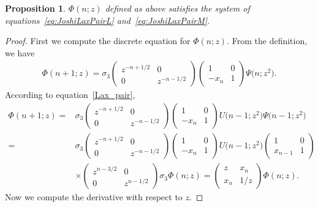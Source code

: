 \documentclass[pdftex]{sigma}%
\numberwithin{equation}{section}
\newtheorem{Proposition}[Theorem]{Proposition}
 { \theoremstyle{definition}
\newtheorem{Definition}[Theorem]{Definition}
\newtheorem{Note}[Theorem]{Note}
\newtheorem{Example}[Theorem]{Example}
\newtheorem{problem}[Theorem]{Riemann--Hilbert Problem}
\newtheorem{Remark}[Theorem]{Remark} }
\begin{document}
	\begin{Proposition}
	\label{Prop:connectionJoshi}
		$\Phi(n;z)$ defined as above satisfies the system of equations~\eqref{eq:JoshiLaxPairL} and~\eqref{eq:JoshiLaxPairM}.
	\end{Proposition}

	\begin{proof}
		First we compute the discrete equation for $\Phi(n;z)$. From the definition, we have
		\begin{align*}
			\Phi(n+1;z)=\sigma_3\begin{pmatrix}
				z^{-n+1/2} & 0\\
				0 & z^{-n-1/2}
			\end{pmatrix}\begin{pmatrix}
				1 & 0\\
				-x_{n} & 1
			\end{pmatrix}\Psi\big(n;z^2\big).
		\end{align*}
		According to equation~\eqref{Lax_pair},
		\begin{align*}
			\Phi(n+1;z)={}&\sigma_3\begin{pmatrix}
				z^{-n+1/2} & 0\\
				0 & z^{-n-1/2}
			\end{pmatrix}\begin{pmatrix}
				1 & 0\\
				-x_{n} & 1
			\end{pmatrix}U\big(n-1;z^2\big)\Psi\big(n-1;z^2\big)\\
			={}&\sigma_3\begin{pmatrix}
				z^{-n+1/2} & 0\\
				0 & z^{-n-1/2}
			\end{pmatrix}\begin{pmatrix}
				1 & 0\\
				-x_{n} & 1
			\end{pmatrix}U\big(n-1;z^2\big)\begin{pmatrix}
				1 & 0\\
				x_{n-1} & 1
			\end{pmatrix}
\\
&\times\begin{pmatrix}
				z^{n-3/2} & 0\\
				0 & z^{n-1/2}
			\end{pmatrix}\sigma_3\Phi(n;z)
			=\begin{pmatrix}
				z & x_n\\
				x_n & 1/z
			\end{pmatrix}\Phi(n;z).
		\end{align*}
		Now we compute the derivative with respect to $z$.


\end{proof}
\end{document}
